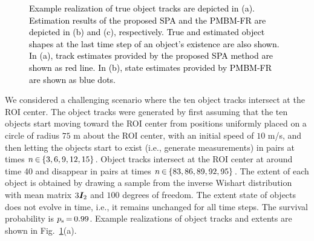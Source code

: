 \documentclass[10pt, twoside, romanappendices]{IEEEtran}
\providecommand{\rd}{\textcolor{black}}
\providecommand{\rmv}{\hspace*{-.3mm}}
\begin{document}
\begin{figure}[t!]
\captionsetup{singlelinecheck = false, justification=justified}
\vspace{.5mm}
\caption{\rd{Example realization of true object tracks are depicted in (a). Estimation results of the proposed SPA and the PMBM-FR are depicted in (b) and (c), respectively. True and estimated object shapes at the last time step of an object's existence are also shown. In (a), track estimates provided by the proposed SPA method are shown as red line. In (b), state estimates provided by PMBM-FR are shown as blue dots.}}
\label{fig:topology}
\end{figure}

We considered a challenging scenario where the ten object tracks intersect at the ROI center. The object tracks were generated by first assuming that the ten objects start moving toward the ROI center from positions uniformly placed on a circle of radius $75$ m about the ROI center, with an initial speed of $10$ m/s, and then letting the objects start to exist (i.e., generate measurements) in pairs at times $n \rmv\in\rmv \{ 3, 6, 9, 12, 15\}$. Object tracks intersect at the ROI center at around time 40 and disappear in pairs at times $n \rmv\in\rmv \{ 83, 86, 89, 92, 95\}$. The extent of each object is obtained by drawing a sample from the inverse Wishart distribution with mean matrix $3 \M{I}_2$ and $100$ degrees of freedom. The extent state of objects does not evolve in time, i.e., it remains unchanged for all time steps.  The survival probability is $p_{\mathrm{s}} \rmv=\rmv 0.99$. Example realizations of object tracks and extents are shown in Fig.~\ref{fig:topology}(a).
\end{document}
